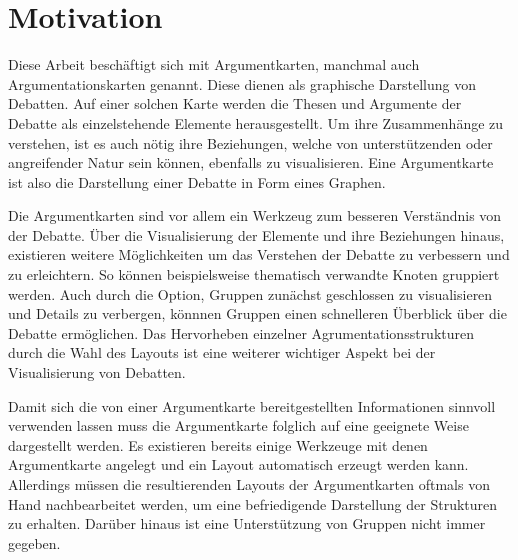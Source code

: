 \chapter{Motivation}
Diese Arbeit beschäftigt sich mit Argumentkarten, manchmal auch Argumentationskarten genannt. Diese dienen als graphische Darstellung von Debatten. 
Auf einer solchen Karte werden die Thesen und Argumente der Debatte als einzelstehende Elemente herausgestellt. 
Um ihre Zusammenhänge zu verstehen, ist es auch nötig ihre Beziehungen, welche von unterstützenden oder angreifender Natur sein können, ebenfalls zu visualisieren.
Eine Argumentkarte ist also die Darstellung einer Debatte in Form eines Graphen.


Die Argumentkarten sind vor allem ein Werkzeug zum besseren Verständnis von der Debatte. 
Über die Visualisierung der Elemente und ihre Beziehungen hinaus, existieren weitere Möglichkeiten um das Verstehen der Debatte zu verbessern und zu erleichtern.
So können beispielsweise thematisch verwandte Knoten gruppiert werden. 
Auch durch die Option, Gruppen zunächst geschlossen zu visualisieren und Details zu verbergen, könnnen Gruppen einen schnelleren Überblick über die Debatte ermöglichen.
Das Hervorheben einzelner Agrumentationsstrukturen durch die Wahl des Layouts ist eine weiterer wichtiger Aspekt bei der Visualisierung von Debatten.

Damit sich die von einer Argumentkarte bereitgestellten Informationen sinnvoll verwenden lassen muss die Argumentkarte folglich auf eine geeignete Weise dargestellt werden.
Es existieren bereits einige Werkzeuge mit denen Argumentkarte angelegt  und ein Layout automatisch erzeugt werden kann. 
Allerdings müssen die resultierenden Layouts der Argumentkarten oftmals von Hand nachbearbeitet werden, um eine befriedigende Darstellung der Strukturen zu erhalten.
Darüber hinaus ist eine Unterstützung von Gruppen nicht immer gegeben.

